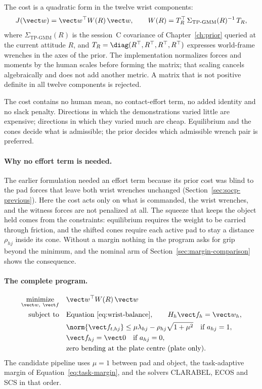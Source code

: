 The cost is a quadratic form in the twelve wrist components:
\begin{equation}
J(\vect w)=\vect w^\top W(R)\,\vect w,\qquad
W(R)=T_R^\top\,\Sigma_{\mathrm{TP\text{-}GMM}}(R)^{-1}\,T_R,
\label{eq:wrist-objective}
\end{equation}
where $\Sigma_{\mathrm{TP\text{-}GMM}}(R)$ is the session~C covariance of Chapter~\ref{ch:prior} queried at the current attitude $R$, and $T_R=\diag(R^\top,R^\top,R^\top,R^\top)$ expresses world-frame wrenches in the axes of the prior. The implementation normalizes forces and moments by the human scales before forming the matrix; that scaling cancels algebraically and does not add another metric. A matrix that is not positive definite in all twelve components is rejected.

The cost contains no human mean, no contact-effort term, no added identity and no slack penalty. Directions in which the demonstrations varied little are expensive; directions in which they varied much are cheap. Equilibrium and the cones decide what is admissible; the prior decides which admissible wrench pair is preferred.

\paragraph{Why no effort term is needed.}
The earlier formulation needed an effort term because its prior cost was blind to the pad forces that leave both wrist wrenches unchanged (Section~\ref{sec:socp-previous}). Here the cost acts only on what is commanded, the wrist wrenches, and the witness forces are not penalized at all. The squeeze that keeps the object held comes from the constraints: equilibrium requires the weight to be carried through friction, and the shifted cones require each active pad to stay a distance $\rho_{hj}$ inside its cone. Without a margin nothing in the program asks for grip beyond the minimum, and the nominal arm of Section~\ref{sec:margin-comparison} shows the consequence.

\paragraph{The complete program.}
\begin{equation}
\begin{aligned}
\underset{\vect w,\ \vect f}{\operatorname{minimize}}\quad&\vect w^\top W(R)\,\vect w\\
\text{subject to}\quad&\text{Equation~\eqref{eq:wrist-balance}},\qquad H_h\vect f_h=\vect w_h,\\
&\norm{\vect f_{t,hj}}\leq\mu\lambda_{hj}-\rho_{hj}\sqrt{1+\mu^2}\quad\text{if }a_{hj}=1,\\
&\vect f_{hj}=\vect0\quad\text{if }a_{hj}=0,\\
&\text{zero bending at the plate centre (plate only)}.
\end{aligned}
\label{eq:wrist-socp}
\end{equation}
The candidate pipeline uses $\mu=1$ between pad and object, the task-adaptive margin of Equation~\eqref{eq:task-margin}, and the solvers CLARABEL, ECOS and SCS in that order.

